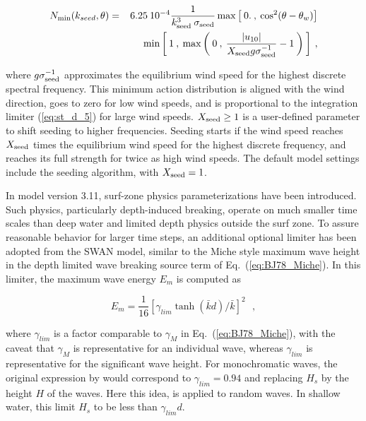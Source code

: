 
\begin{eqnarray}
N_{\min}(k_{seed},\theta) & = & 
        6.25 \: 10^{-4} \frac{1}{k_{\rm seed}^3 \: \sigma_{\rm seed}}
        \max \left [ \: 0. \: , \: \cos^2 ( \theta - \theta_w ) \right ]
                             \nonumber \\ & & \hspace{5mm}
        \min \left [ \: 1 \: , \: \max \left ( \: 0 \: , \: 
        \frac{|u_{10}|}{X_{\rm seed} g \sigma_{\rm seed}^{-1}}-1 
\: \right ) \: \right ] \: , \label{eq:seed} \end{eqnarray}

\noindent
where $g \sigma_{\rm seed}^{-1}$ approximates the equilibrium wind speed for
the highest discrete spectral frequency. This minimum action distribution is
aligned with the wind direction, goes to zero for low wind speeds, and is
proportional to the integration limiter (\ref{eq:st_d_5}) for large wind
speeds. $X_{\rm seed} \geq 1$ is a user-defined parameter to shift seeding to
higher frequencies. Seeding starts if the wind speed reaches $X_{\rm seed}$
times the equilibrium wind speed for the highest discrete frequency, and
reaches its full strength for twice as high wind speeds. The default model
settings include the seeding algorithm, with $X_{\rm seed} = 1$.

In model version 3.11, surf-zone physics parameterizations have been
introduced. Such physics, particularly depth-induced breaking, operate on much
smaller time scales than deep water and limited depth physics outside the surf
zone. To assure reasonable behavior for larger time steps, an additional
optional limiter has been adopted from the SWAN model, similar to the Miche
style maximum wave height in the depth limited wave breaking source term of
Eq.~(\ref{eq:BJ78_Miche}). In this limiter, the maximum wave energy $E_m$ is
computed as


\begin{equation}
E_m = \frac{1}{16} [ \gamma_{lim}  \tanh ( \bar{k} d ) / \bar{k} ] ^2
\:\:\: , \label{eq:MLIM} 
\end{equation}

\noindent
where $\gamma_{lim}$ is a factor comparable to $\gamma_M$ in
Eq.~(\ref{eq:BJ78_Miche}), with the caveat that $\gamma_M$ is representative
for an individual wave, whereas $\gamma_{lim}$ is representative for the
significant wave height. For monochromatic waves, the original expression by
\cite{art:Miche44} would correspond to $\gamma_{lim} = 0.94$ and replacing
$H_s$ by the height $H$ of the waves. Here this idea, is applied to random
waves.  In shallow water, this limit $H_s$ to be less than $\gamma_{lim} d$.

